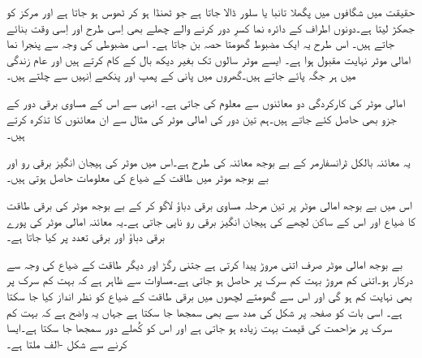 حقیقت میں شگافوں میں پگھلا تانبا یا سلور  ڈالا جاتا ہے جو ٹھنڈا ہو کر ٹھوس ہو جاتا ہے اور مرکز کو جھکڑ لیتا ہے۔دونوں اطراف کے دائرہ نما کسرِ دور کرنے والے چھلے بھی اِسی طرح اور اِسی وقت بنائے جاتے ہیں۔  اس طرح یہ ایک مضبوط گھومتا حصہ بن جاتا ہے۔ اسی مضبوطی کی وجہ سے  پنجرا نما امالی موٹر نہایت مقبول ہوا ہے۔ ایسے موٹر سالوں تک بغیر دیکھ بال کے کام کرتے ہیں اور عام زندگی میں ہر جگہ پائے جاتے ہیں۔گھروں میں پانی کے پمپ اور پنکھے اِنہیں سے چلتے ہیں۔

امالی موٹر کی کارکردگی دو معائنوں سے معلوم کی جاتی ہے۔ انہی سے اس کے مساوی برقی دور کے جزو بھی حاصل کئے جاتے ہیں۔ہم تین دور کی امالی موٹر کی مثال سے ان معائنوں کا تذکرہ کرتے ہیں۔

یہ معائنہ بالکل ٹرانسفارمر کے بے بوجھ معائنہ کی طرح ہے۔اس میں موٹر کی ہیجان انگیز برقی رو اور بے بوجھ موٹر میں طاقت کے ضیاع کی معلومات حاصل ہوتی ہیں۔ 

اس میں  بے بوجھ امالی موٹر پر تین مرحلہ مساوی برقی دباؤ  لاگو کر کے بے بوجھ موٹر کی برقی طاقت کا ضیاع  اور اس کے ساکن لچھے  کی ہیجان انگیز برقی رو  ناپی جاتی ہے۔یہ معائنہ امالی موٹر کی پورے برقی دباؤ اور برقی تعدد پر کیا جاتا ہے۔

بے بوجھ امالی موٹر صرف اتنی مروڑ پیدا کرتی ہے جتنی رگڑ اور دیگر طاقت کے ضیاع کی وجہ سے درکار ہو۔اتنی کم مروڑ بہت کم سرک پر حاصل ہو جاتی ہے۔مساوات   سے ظاہر ہے کہ بہت کم سرک پر   بھی نہایت کم ہو گی  اور اس سے گھومتے لچھوں میں برقی طاقت کے ضیاع کو نظر انداز کیا جا سکتا ہے۔ اسی بات کو صفحہ  پر شکل   کی مدد سے بھی سمجھا جا سکتا ہے جہاں یہ واضح ہے کہ بہت کم سرک پر مزاحمت  کی قیمت بہت زیادہ ہو جاتی ہے اور اس کو کُھلے دور سمجھا جا سکتا ہے۔ایسا کرنے سے شکل -الف ملتا ہے۔

